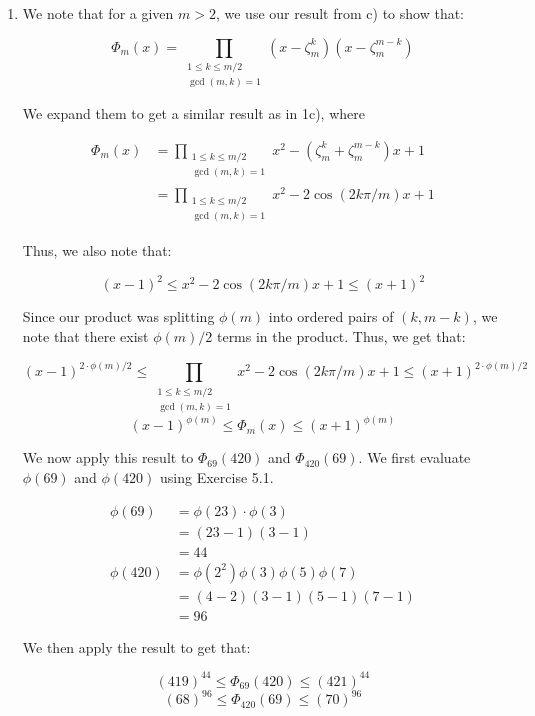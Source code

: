 \documentclass{article}
\begin{document}
\begin{enumerate}
\begin{enumerate}
    \item

    We note that for a given $m > 2$, we use our result from c) to show that:

    $$\Phi_m(x) = \prod_{\substack{1 \leq k \leq m/2 \\ \gcd(m, k) = 1}} (x - \zeta_m^k) (x - \zeta_m^{m-k})$$

    We expand them to get a similar result as in 1c), where 

    \begin{align*}
        \Phi_m(x) &= \prod_{\substack{1 \leq k \leq m/2 \\ \gcd(m, k) = 1}} x^2 - (\zeta^k_m + \zeta^{m-k}_m)x + 1 \\
        &= \prod_{\substack{1 \leq k \leq m/2 \\ \gcd(m, k) = 1}} x^2 - 2\cos(2k\pi/m)x + 1
    \end{align*}

    Thus, we also note that: 

    $$(x-1)^2 \leq  x^2 - 2\cos(2k\pi/m)x + 1\leq (x+1)^2$$

    Since our product was splitting $\phi(m)$ into ordered pairs of $(k, m -k)$, we note that there exist $\phi(m)/2$ terms in the product. Thus, we get that:

    $$(x-1)^{2\cdot\phi(m)/2}\leq \prod_{\substack{1 \leq k \leq m/2 \\ \gcd(m, k) = 1}} x^2 - 2\cos(2k\pi/m)x + 1 \leq (x+1)^{2 \cdot \phi(m)/2}$$
    $$(x-1)^{\phi(m)}\leq \Phi_m(x) \leq (x+1)^{\phi(m)}$$

    We now apply this result to $\Phi_{69}(420)$ and $\Phi_{420}(69)$. We first evaluate $\phi(69)$ and $\phi(420)$ using Exercise 5.1. 

    \begin{align*}
        \phi(69) &= \phi(23)\cdot\phi(3)\\
        &= (23 - 1)(3 - 1)\\
        &= 44 \\
        \phi(420) &= \phi(2^2)\phi(3)\phi(5)\phi(7)\\
        &= (4-2) (3-1) (5-1)(7-1)\\
        &= 96
    \end{align*}

    We then apply the result to get that: 

    $$(419)^{44} \leq \Phi_{69}(420) \leq (421)^{44}$$
    $$(68)^{96} \leq \Phi_{420}(69) \leq (70)^{96}$$


\end{enumerate}
\end{enumerate}
\end{document}
